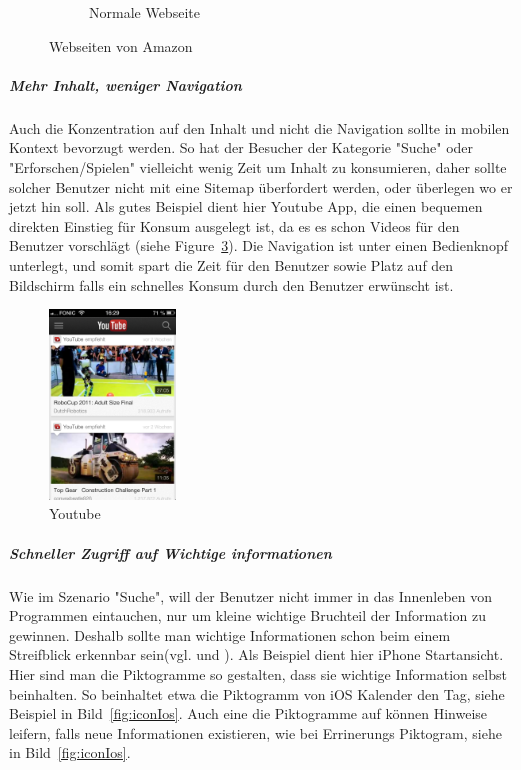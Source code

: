 \begin{figure}
\begin{subfigure}[b]{0.6\textwidth}
		\caption{Normale Webseite}\label{fig:amazonFull}
	\end{subfigure}
	\caption{Webseiten von Amazon}\label{fig:amazonSites}
\end{figure}

\subparagraph{Mehr Inhalt, weniger Navigation} 
\label{subp:entferne_das_fett} 

Auch die Konzentration auf den Inhalt und nicht die Navigation sollte in mobilen Kontext bevorzugt werden\cite[Seite 52]{mobileFirst}. So hat der Besucher der Kategorie "Suche" oder "Erforschen/Spielen" vielleicht wenig Zeit um Inhalt zu konsumieren, daher sollte  solcher Benutzer nicht mit eine Sitemap überfordert werden, oder überlegen wo er jetzt hin soll. Als gutes Beispiel dient hier Youtube App, die einen bequemen direkten Einstieg für Konsum ausgelegt ist, da es es schon Videos für den Benutzer vorschlägt (siehe Figure~\ref{fig:youtube}). Die Navigation ist unter einen Bedienknopf unterlegt, und somit spart die Zeit für den Benutzer sowie Platz auf den Bildschirm falls ein schnelles Konsum durch den Benutzer erwünscht ist.

\begin{figure}
	\begin{center}
	\includegraphics[width=0.3\textwidth]{img/youtube.png}
	\caption{Youtube}\label{fig:youtube}
\end{center}
\end{figure}

\subparagraph{Schneller Zugriff auf Wichtige informationen} 
\label{subp:subparagraph_name}

Wie im Szenario "Suche", will der Benutzer nicht immer in das Innenleben von Programmen eintauchen, nur um kleine wichtige Bruchteil der Information zu gewinnen. Deshalb sollte man wichtige Informationen schon beim einem Streifblick erkennbar sein(vgl. \cite[Seite 54]{mobileFrontier} und \cite{Neil:2012uf}). Als Beispiel dient hier iPhone Startansicht. Hier sind man die Piktogramme so gestalten, dass sie wichtige Information selbst beinhalten. So beinhaltet etwa die Piktogramm von iOS Kalender den Tag, siehe Beispiel in Bild~\ref{fig:iconIos}. Auch eine die Piktogramme auf können Hinweise leifern, falls neue Informationen existieren, wie bei Errinerungs Piktogram, siehe in Bild~\ref{fig:iconIos}.

